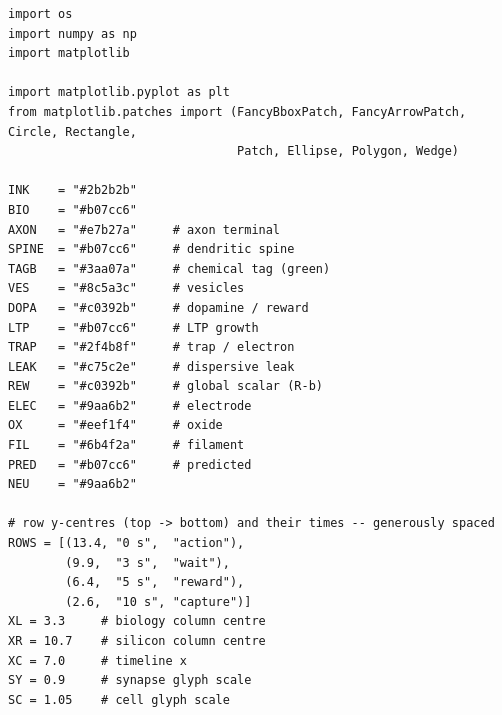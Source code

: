 \begin{lstlisting}[caption={schematics.ipynb code cell 5},label={lst:mrl-nb-schematics-5}]
import os
import numpy as np
import matplotlib

import matplotlib.pyplot as plt
from matplotlib.patches import (FancyBboxPatch, FancyArrowPatch, Circle, Rectangle,
                                Patch, Ellipse, Polygon, Wedge)

INK    = "#2b2b2b"
BIO    = "#b07cc6"
AXON   = "#e7b27a"     # axon terminal
SPINE  = "#b07cc6"     # dendritic spine
TAGB   = "#3aa07a"     # chemical tag (green)
VES    = "#8c5a3c"     # vesicles
DOPA   = "#c0392b"     # dopamine / reward
LTP    = "#b07cc6"     # LTP growth
TRAP   = "#2f4b8f"     # trap / electron
LEAK   = "#c75c2e"     # dispersive leak
REW    = "#c0392b"     # global scalar (R-b)
ELEC   = "#9aa6b2"     # electrode
OX     = "#eef1f4"     # oxide
FIL    = "#6b4f2a"     # filament
PRED   = "#b07cc6"     # predicted
NEU    = "#9aa6b2"

# row y-centres (top -> bottom) and their times -- generously spaced
ROWS = [(13.4, "0 s",  "action"),
        (9.9,  "3 s",  "wait"),
        (6.4,  "5 s",  "reward"),
        (2.6,  "10 s", "capture")]
XL = 3.3     # biology column centre
XR = 10.7    # silicon column centre
XC = 7.0     # timeline x
SY = 0.9     # synapse glyph scale
SC = 1.05    # cell glyph scale


\end{lstlisting}
